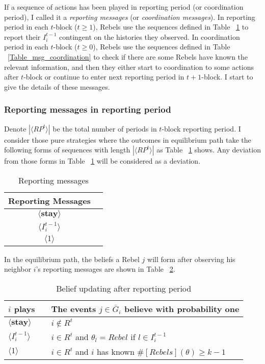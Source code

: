 \documentclass[12pt,letter]{article}
\theoremstyle{definition}
\theoremstyle{remark}
\theoremstyle{claim}
\begin{document}
If a sequence of actions has been played in reporting period (or coordination period), I called it a \textit{reporting messages} (or \textit{coordination messages}). In reporting period in each $t$-block ($t\geq 1$), Rebels use the sequences defined in Table ~\ref{Table_msg_reporting} to report their $I^{t-1}_i$ contingent on the histories they observed. In coordination period in each $t$-block ($t\geq 0$), Rebels use the sequences defined in Table ~\ref{Table_msg_coordination} to check if there are some Rebels have known the relevant information, and then they either start to coordination to some actions after $t$-block or continue to enter next reporting period in $t+1$-block. I start to give the details of these messages.



\subsubsection*{Reporting messages in reporting period}

Denote $|\langle RP^t \rangle|$ be the total number of periods in $t$-block reporting period. I consider those pure strategies where the outcomes in equilibrium path take the following forms of sequences with length $|\langle RP^t \rangle|$ as Table ~\ref{Table_msg_reporting} shows. Any deviation from those forms in Table ~\ref{Table_msg_reporting} will be considered as a deviation. 

\begin{table}[ht]
\caption{Reporting messages}
\label{Table_msg_reporting}
\begin{center}
\begin{tabular}{c c }
Reporting Messages 		&   \\
\hline
$\langle  \textbf{stay} \rangle$ 	& 	 \\
$\langle  {I^{t-1}_i} \rangle$ 		&   \\
$\langle 1 \rangle$ 		             &    
\end{tabular}
\end{center}
\end{table}
In the equilibrium path, the beliefs a Rebel $j$ will form after observing his neighbor $i$'s reporting messages are shown in Table ~\ref{Table_blf_up_reporting}.

\begin{table}[ht]
\caption{Belief updating after reporting period}
\label{Table_blf_up_reporting}
\begin{center}
\begin{tabular}{l c l}
$i$ plays 		&  			& The events $j\in \bar{G}_i$ believe with probability one  \\
\hline
$\langle  \textbf{stay} \rangle$ 	& 			    & $i\notin R^t$  \\
$\langle  {I^{t-1}_i} \rangle$ 		&  			& $i\in R^t$ and $\theta_l=Rebel$ if $l\in I^{t-1}_i$      \\
$\langle 1 \rangle$ 		             &  			& $i\in R^t$ and $i$ has known $\#[Rebels](\theta)\geq k-1$ \\
\end{tabular}
\end{center}
\end{table}
\end{document}
